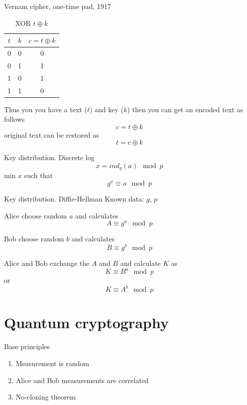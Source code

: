 \documentclass[10pt,pdf,hyperref={unicode}]{beamer}
\begin{document}
\begin{frame}{Vernam cipher, one-time pad, 1917}
  \begin{table}
    \centering
    \begin{tabular}{|c|c|c|}
      \hline
      $t$ & $k$ & $c = t \oplus k$ \\ \hline
      0  & 0 & 0 \\
      0  & 1 & 1 \\
      1  & 0 & 1 \\
      1  & 1 & 0 \\ \hline
    \end{tabular}
    \caption{XOR $t \oplus k$}
    \label{tblXOR}
  \end{table}
  Thus you you have a text ($t$) and key ($k$) then you can get an
  encoded text as follows
  \[
  c = t \oplus k
  \]
  original text can be restored as
  \[
  t = c \oplus k
  \]  
\end{frame}

\begin{frame}{Key distribution. Discrete log}
  \[
  x = ind_g\left(a\right) \mod{p}
  \]
  min $x$ such that
  \[
  g^x \equiv a \mod{p}
  \]
\end{frame}

\begin{frame}{Key distribution. Diffie-Hellman}
  Known data: $g$, $p$
  
  Alice choose random $a$ and calculates
  \[
  A \equiv g^a \mod{p}
  \]

  Bob choose random $b$ and calculates
  \[
  B \equiv g^b \mod{p}
  \]

  Alice and Bob exchange the $A$ and $B$ and calculate $K$ as
  \[
  K \equiv B^a \mod{p}
  \]
  or
  \[
  K \equiv A^b \mod{p}
  \]  
\end{frame}


\section{Quantum cryptography}

\begin{frame}{Base principles}
  \begin{enumerate}
  \item Measurement is random
  \item Alice and Bob measurements are correlated
  \item No-cloning theorem
  \end{enumerate}
\end{frame}
\end{document}
